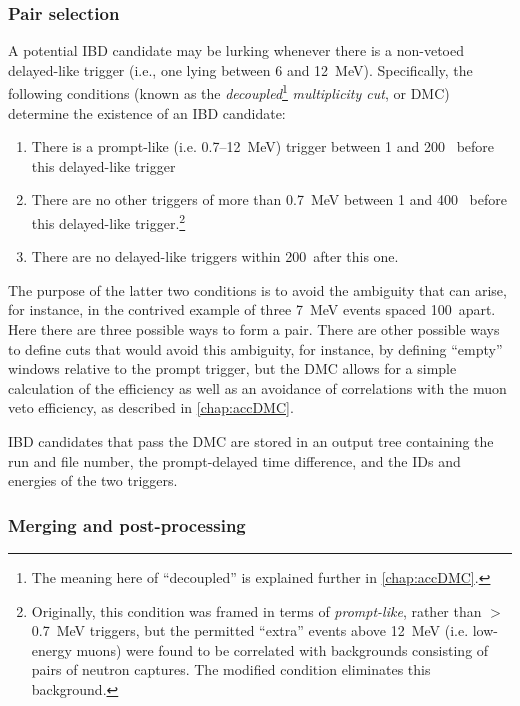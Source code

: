\documentclass[../thesis.tex]{subfiles}
\begin{document}
\subsubsection{Pair selection}
\label{sec:pairSel}

A potential IBD candidate may be lurking whenever there is a non-vetoed
delayed-like trigger (i.e., one lying between 6 and 12~MeV). Specifically, the
following conditions (known as the \emph{decoupled}\footnote{The meaning here of
  ``decoupled'' is explained further in \autoref{chap:accDMC}.}
\emph{multiplicity cut}, or DMC) determine the existence of an IBD candidate:

\begin{enumerate}
\item There is a prompt-like (i.e. 0.7--12~MeV) trigger between 1 and 200~\us
  before this delayed-like trigger
\item There are no other triggers of more than 0.7~MeV between 1 and 400~\us
  before this delayed-like trigger.\footnote{Originally, this condition was
    framed in terms of \emph{prompt-like}, rather than $>$0.7~MeV triggers, but
    the permitted ``extra'' events above 12~MeV (i.e. low-energy muons) were
    found to be correlated with backgrounds consisting of pairs of neutron
    captures. The modified condition eliminates this background.}
\item There are no delayed-like triggers within 200~\us after this one.
\end{enumerate}

The purpose of the latter two conditions is to avoid the ambiguity that can
arise, for instance, in the contrived example of three 7~MeV events spaced
100~\us apart. Here there are three possible ways to form a pair. There are
other possible ways to define cuts that would avoid this ambiguity, for
instance, by defining ``empty'' windows relative to the prompt trigger, but the
DMC allows for a simple calculation of the efficiency as well as an avoidance of
correlations with the muon veto efficiency, as described in
\autoref{chap:accDMC}.

IBD candidates that pass the DMC are stored in an output tree containing the run
and file number, the prompt-delayed time difference, and the IDs and energies of
the two triggers.

\subsubsection{Merging and post-processing}
\label{sec:selMergingTwo}
\end{document}
